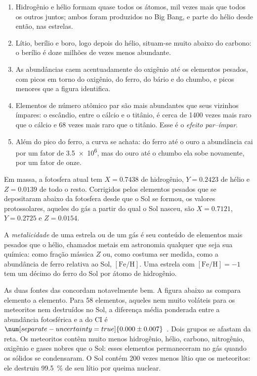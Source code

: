 \begin{enumerate}
\item Hidrogênio e hélio formam quase todos os átomos, mil vezes
  mais que todos os outros juntos; ambos foram produzidos no Big Bang, e
  parte do hélio desde então, nas estrelas.
\item Lítio, berílio e boro, logo depois do hélio, situam-se muito abaixo
  do carbono: o berílio é doze milhões de vezes menos abundante.
\item As abundâncias caem acentuadamente do oxigênio até os elementos
  pesados, com picos em torno do oxigênio, do ferro, do bário e do chumbo,
  e picos menores que a figura identifica.
\item Elementos de número atômico par são mais abundantes que seus vizinhos
  ímpares: o escândio, entre o cálcio e o titânio, é cerca de \num{1400}
  vezes mais raro que o cálcio e \num{68} vezes mais raro que o titânio. Esse
  é o \emph{efeito par--ímpar}.
\item Além do pico do ferro, a curva se achata: do ferro até o ouro a
  abundância cai por um fator de \num{3.5e6}, mas do ouro até o chumbo ela
  sobe novamente, por um fator de onze.
\end{enumerate}

Em massa, a fotosfera atual tem $X = 0.7438$ de hidrogênio,
$Y = 0.2423$ de hélio e $Z = 0.0139$ de todo o resto. Corrigidos pelos
elementos pesados que se depositaram abaixo da fotosfera desde que o Sol
se formou, os valores protossolares, aqueles do gás a partir do qual o Sol
nasceu, são $X = 0.7121$, $Y = 0.2725$ e $Z = 0.0154$.

\begin{definition}[Metalicidade]\label{def:b3:origin-of-elements:metallicity}
A \emph{metalicidade} de uma estrela ou de um gás é seu
conteúdo de elementos mais pesados que o hélio, chamados metais em astronomia
qualquer que seja sua química: como fração mássica $Z$ ou, como costuma ser
medida, como a abundância de ferro relativa ao Sol, $[\mathrm{Fe/H}]$.
Uma estrela com $[\mathrm{Fe/H}] = -1$ tem um décimo do ferro do Sol
por átomo de hidrogênio.
\end{definition}

As duas fontes das  concordam notavelmente bem. A
figura abaixo as compara elemento a elemento. Para 58 elementos, aqueles
nem muito voláteis para os meteoritos nem destruídos no Sol, a diferença
média ponderada entre a abundância fotosférica e a do CI é
$\num[separate-uncertainty=true]{0.000 \pm 0.007}$~. Dois grupos
se afastam da reta. Os meteoritos contêm muito menos hidrogênio, hélio,
carbono, nitrogênio, oxigênio e gases nobres que o Sol: esses elementos
permaneceram no gás quando os sólidos se condensaram. O Sol contém
\num{200} vezes menos lítio que os meteoritos: ele destruiu
\qty{99.5}{\percent} de seu lítio por queima nuclear.

